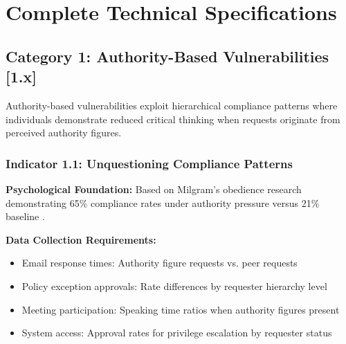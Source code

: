 \documentclass[10pt,twocolumn]{IEEEtran}
\begin{document}
\section{Complete Technical Specifications}

\subsection{Category 1: Authority-Based Vulnerabilities [1.x]}

Authority-based vulnerabilities exploit hierarchical compliance patterns where individuals demonstrate reduced critical thinking when requests originate from perceived authority figures.

\subsubsection{Indicator 1.1: Unquestioning Compliance Patterns}

\textbf{Psychological Foundation:} Based on Milgram's obedience research demonstrating 65\% compliance rates under authority pressure versus 21\% baseline \cite{milgram1974}.

\textbf{Data Collection Requirements:}
\begin{itemize}
\item Email response times: Authority figure requests vs. peer requests
\item Policy exception approvals: Rate differences by requester hierarchy level
\item Meeting participation: Speaking time ratios when authority figures present
\item System access: Approval rates for privilege escalation by requester status
\end{itemize}
\end{document}
